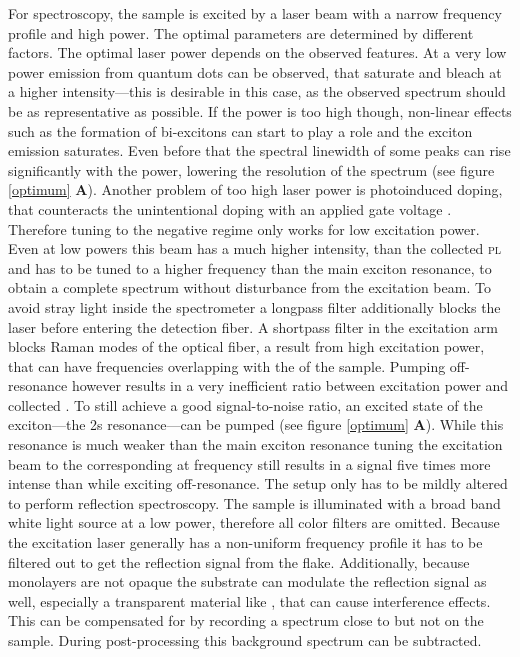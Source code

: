 For \pl spectroscopy, the sample is excited by a laser beam with a narrow frequency profile and high power. The optimal parameters are determined by different factors. The optimal laser power depends on the observed features. At a very low power emission from quantum dots can be observed, that saturate and bleach at a higher intensity---this is desirable in this case, as the observed spectrum should be as representative as possible. If the power is too high though, non-linear effects such as the formation of bi-excitons can start to play a role and the exciton emission saturates. Even before that the spectral linewidth of some peaks can rise significantly with the power, lowering the resolution of the spectrum (see figure \ref{optimum} \textbf{A}). Another problem of too high laser power is photoinduced doping, that counteracts the unintentional doping with an applied gate voltage \cite{wang_photoinduced_2016,cunningham_photoinduced_2017}. Therefore tuning to the negative regime only works for low excitation power. Even at low powers this beam has a much higher intensity, than the collected \textsc{pl} and has to be tuned to a higher frequency than the main exciton resonance, to obtain a complete spectrum without disturbance from the excitation beam. To avoid stray light inside the spectrometer a longpass filter additionally blocks the laser before entering the detection fiber. A shortpass filter in the excitation arm blocks Raman modes of the optical fiber, a result from high excitation power, that can have frequencies overlapping with the \pl of the sample. Pumping off-resonance however results in a very inefficient ratio between excitation power and collected \pl\!. To still achieve a good signal-to-noise ratio, an excited state of the exciton---the 2s resonance---can be pumped (see figure \ref{optimum} \textbf{A}). While this resonance is much weaker than the main exciton resonance tuning the excitation beam to the corresponding at frequency still results in a signal five times more intense than while exciting off-resonance.
The setup only has to be mildly altered to perform reflection spectroscopy. The sample is illuminated with a broad band white light source at a low power, therefore all color filters are omitted. Because the excitation laser generally has a non-uniform frequency profile it has to be filtered out to get the reflection signal from the \wse flake. Additionally, because \tmdg monolayers are not opaque the substrate can modulate the reflection signal as well, especially a transparent material like \hbn, that can cause interference effects. This can be compensated for by recording a spectrum close to but not on the sample. During post-processing this background spectrum can be subtracted.

